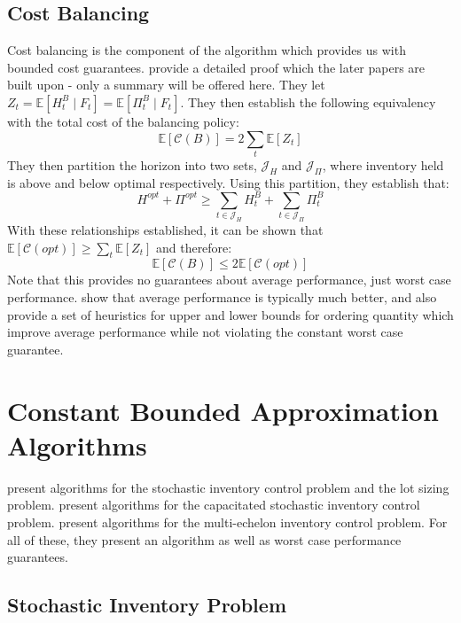 \documentclass[12pt]{article}
\newcommand{\EX}{\mathbb{E}}
\begin{document}
\subsection{Cost Balancing}

Cost balancing is the component of the algorithm which provides us with bounded cost guarantees. \cite{levi:2007} provide a detailed proof which the later papers are built upon - only a summary will be offered here. They let $Z_t = \EX[H_t^B \; | \; F_t] = \EX[\Pi_t^B \; | \; F_t]$. They then establish the following equivalency with the total cost of the balancing policy:
$$
	\EX[\mathcal{C}(B)] = 2 \sum_t \EX[Z_t]
$$ 
They then partition the horizon into two sets, $\mathcal{J}_H$ and $\mathcal{J}_{\Pi}$, where inventory held is above and below optimal respectively. Using this partition, they establish that:
$$
	H^{opt} + \Pi^{opt} \geq \sum_{t \in \mathcal{J}_H} H_t^B + \sum_{t \in \mathcal{J}_{\Pi}} \Pi_t^B
$$
With these relationships established, it can be shown that $\EX[\mathcal{C}(opt)] \geq \sum_t \EX[Z_t]$ and therefore:
$$
	\EX[\mathcal{C}(B)] \leq 2 \EX[\mathcal{C}(opt)]
$$
Note that this provides no guarantees about average performance, just worst case performance. \cite{hurley:2007} show that average performance is typically much better, and also provide a set of heuristics for upper and lower bounds for ordering quantity which improve average performance while not violating the constant worst case guarantee. 


\section{Constant Bounded Approximation Algorithms}

\cite{levi:2007} present algorithms for the stochastic inventory control problem and the lot sizing problem. \cite{levi:2008} present algorithms for the capacitated stochastic inventory control problem. \cite{levi:2016} present algorithms for the multi-echelon inventory control problem. For all of these, they present an algorithm as well as worst case performance guarantees. 

\subsection{Stochastic Inventory Problem}
\end{document}
